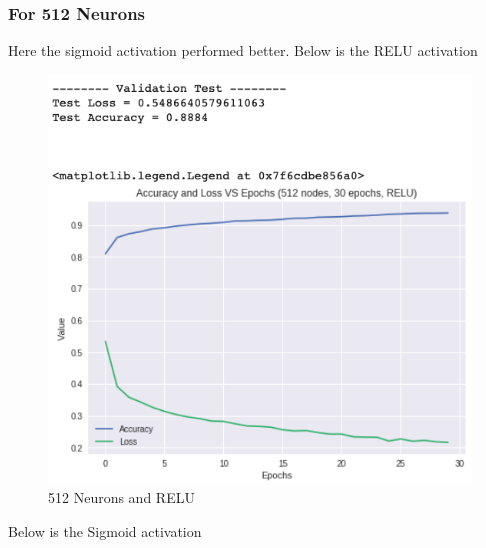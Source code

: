\documentclass[a4paper, 12pt]{article}
\begin{document}
    \pagebreak
    \subsubsection{For 512 Neurons}

    Here the sigmoid activation performed better. Below is the RELU activation

    \begin{figure}[h!]
        \centering
        \captionsetup{justification=centering}
        \includegraphics[scale = 0.3]{512_RELU.png}
        \caption{512 Neurons and RELU}
    \end{figure}

    Below is the Sigmoid activation
    
\end{document}
